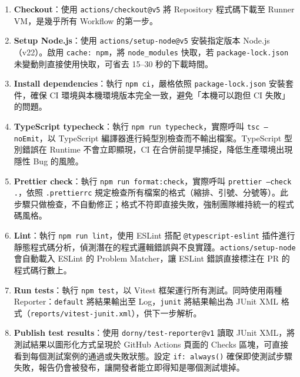\documentclass[11pt,a4paper]{article}
\begin{document}
\begin{enumerate}
    \item \textbf{Checkout}：使用 \texttt{actions/checkout@v5} 將 Repository 程式碼下載至 Runner VM，是幾乎所有 Workflow 的第一步。

    \item \textbf{Setup Node.js}：使用 \texttt{actions/setup-node@v5} 安裝指定版本 Node.js（v22）。啟用 \texttt{cache: npm}，將 \texttt{node\_modules} 快取，若 \texttt{package-lock.json} 未變動則直接使用快取，可省去 15--30 秒的下載時間。

    \item \textbf{Install dependencies}：執行 \texttt{npm ci}，嚴格依照 \texttt{package-lock.json} 安裝套件，確保 CI 環境與本機環境版本完全一致，避免「本機可以跑但 CI 失敗」的問題。

    \item \textbf{TypeScript typecheck}：執行 \texttt{npm run typecheck}，實際呼叫 \texttt{tsc --noEmit}，以 TypeScript 編譯器進行純型別檢查而不輸出檔案。TypeScript 型別錯誤在 Runtime 不會立即顯現，CI 在合併前提早捕捉，降低生產環境出現隱性 Bug 的風險。

    \item \textbf{Prettier check}：執行 \texttt{npm run format:check}，實際呼叫 \texttt{prettier --check .}，依照 \texttt{.prettierrc} 規定檢查所有檔案的格式（縮排、引號、分號等）。此步驟只做檢查，不自動修正；格式不符即直接失敗，強制團隊維持統一的程式碼風格。

    \item \textbf{Lint}：執行 \texttt{npm run lint}，使用 ESLint 搭配 \texttt{@typescript-eslint} 插件進行靜態程式碼分析，偵測潛在的程式邏輯錯誤與不良實踐。\texttt{actions/setup-node} 會自動載入 ESLint 的 Problem Matcher，讓 ESLint 錯誤直接標注在 PR 的程式碼行數上。

    \item \textbf{Run tests}：執行 \texttt{npm test}，以 Vitest 框架運行所有測試。同時使用兩種 Reporter：\texttt{default} 將結果輸出至 Log，\texttt{junit} 將結果輸出為 JUnit XML 格式（\texttt{reports/vitest-junit.xml}），供下一步解析。

    \item \textbf{Publish test results}：使用 \texttt{dorny/test-reporter@v1} 讀取 JUnit XML，將測試結果以圖形化方式呈現於 GitHub Actions 頁面的 Checks 區塊，可直接看到每個測試案例的通過或失敗狀態。設定 \texttt{if: always()} 確保即使測試步驟失敗，報告仍會被發布，讓開發者能立即得知是哪個測試壞掉。
\end{enumerate}
\end{document}
